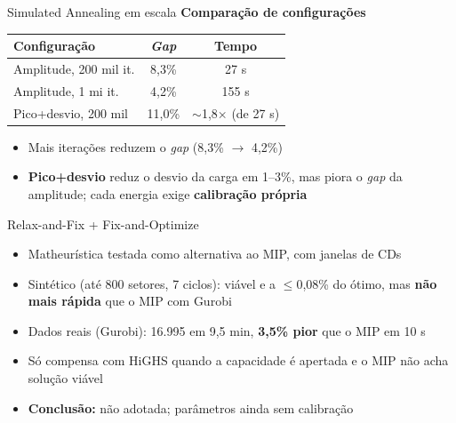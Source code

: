 \documentclass[aspectratio=169,11pt]{beamer}
\begin{document}
\begin{frame}{Simulated Annealing em escala}
  \small
  \textbf{Comparação de configurações}
  \begin{center}
    \begin{tabular}{lcc}
      \toprule
      Configuração & \textit{Gap} & Tempo \\
      \midrule
      Amplitude, 200 mil it. & 8,3\% & 27 s \\
      Amplitude, 1 mi it.    & 4,2\% & 155 s \\
      Pico+desvio, 200 mil   & 11,0\% & $\sim$1,8$\times$ (de 27 s) \\
      \bottomrule
    \end{tabular}
  \end{center}
  \begin{itemize}
    \item Mais iterações reduzem o \textit{gap} (8,3\% $\to$ 4,2\%)
    \item \textbf{Pico+desvio} reduz o desvio da carga em 1--3\%, mas piora o \textit{gap} da amplitude; cada energia exige \textbf{calibração própria}
  \end{itemize}
\end{frame}

\begin{frame}{Relax-and-Fix + Fix-and-Optimize}
  \small
  \begin{itemize}
    \item Matheurística testada como alternativa ao MIP, com janelas de CDs
    \item Sintético (até 800 setores, 7 ciclos): viável e a $\leq$0,08\% do ótimo, mas \textbf{não mais rápida} que o MIP com Gurobi
    \item Dados reais (Gurobi): 16.995 em 9,5 min, \textbf{3,5\% pior} que o MIP em 10 s
    \item Só compensa com HiGHS quando a capacidade é apertada e o MIP não acha solução viável
    \item \textbf{Conclusão:} não adotada; parâmetros ainda sem calibração
  \end{itemize}
\end{frame}
\end{document}
